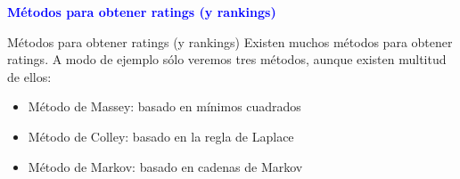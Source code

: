 \documentclass[10pt,hyperref={unicode}]{beamer}
\begin{document}
	
	\begin{frame}
			\begin{center}
				\Huge\textbf{\textsf{\textcolor{blue}{Métodos para obtener ratings (y rankings)}}}
			\end{center}
		\end{frame}
		
		\begin{frame}{Métodos para obtener ratings (y rankings)}
				Existen muchos métodos para obtener ratings. A modo de ejemplo sólo veremos tres métodos, aunque existen multitud de ellos:
				
				\begin{itemize}
					\item Método de Massey: basado en mínimos cuadrados
					\item Método de Colley: basado en la regla de Laplace
					\item Método de Markov: basado en cadenas de Markov
				\end{itemize}
			\end{frame}
	

	
	
	
	
	
		
		
		
		
		
	
\end{document}
